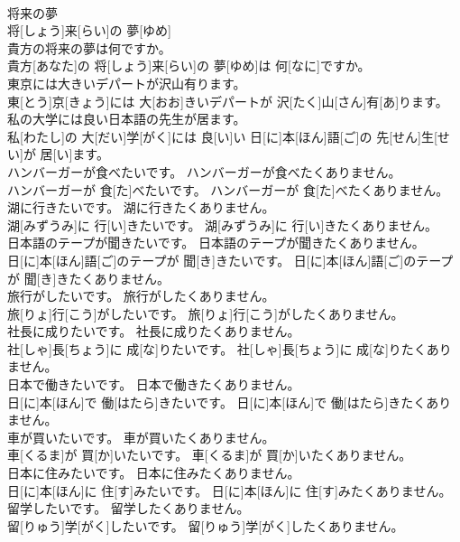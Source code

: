 \documentclass[8pt]{extreport}
\begin{document}
\begin{CJK}{UTF8}{min}
\\	将来の夢	
\\	将[しょう]来[らい]の 夢[ゆめ]	
\\	貴方の将来の夢は何ですか。	
\\	貴方[あなた]の 将[しょう]来[らい]の 夢[ゆめ]は 何[なに]ですか。
\\	東京には大きいデパートが沢山有ります。	
\\	東[とう]京[きょう]には 大[おお]きいデパートが 沢[たく]山[さん]有[あ]ります。
\\	私の大学には良い日本語の先生が居ます。	
\\	私[わたし]の 大[だい]学[がく]には 良[い]い 日[に]本[ほん]語[ご]の 先[せん]生[せい]が 居[い]ます。
\\	ハンバーガーが食べたいです。 ハンバーガーが食べたくありません。	
\\	ハンバーガーが 食[た]べたいです。 ハンバーガーが 食[た]べたくありません。
\\	湖に行きたいです。 湖に行きたくありません。	
\\	湖[みずうみ]に 行[い]きたいです。 湖[みずうみ]に 行[い]きたくありません。
\\	日本語のテープが聞きたいです。 日本語のテープが聞きたくありません。	
\\	日[に]本[ほん]語[ご]のテープが 聞[き]きたいです。 日[に]本[ほん]語[ご]のテープが 聞[き]きたくありません。
\\	旅行がしたいです。 旅行がしたくありません。	
\\	旅[りょ]行[こう]がしたいです。 旅[りょ]行[こう]がしたくありません。
\\	社長に成りたいです。 社長に成りたくありません。	
\\	社[しゃ]長[ちょう]に 成[な]りたいです。 社[しゃ]長[ちょう]に 成[な]りたくありません。
\\	日本で働きたいです。 日本で働きたくありません。	
\\	日[に]本[ほん]で 働[はたら]きたいです。 日[に]本[ほん]で 働[はたら]きたくありません。
\\	車が買いたいです。 車が買いたくありません。	
\\	車[くるま]が 買[か]いたいです。 車[くるま]が 買[か]いたくありません。
\\	日本に住みたいです。 日本に住みたくありません。	
\\	日[に]本[ほん]に 住[す]みたいです。 日[に]本[ほん]に 住[す]みたくありません。
\\	留学したいです。 留学したくありません。	
\\	留[りゅう]学[がく]したいです。 留[りゅう]学[がく]したくありません。

\end{CJK}
\end{document}
